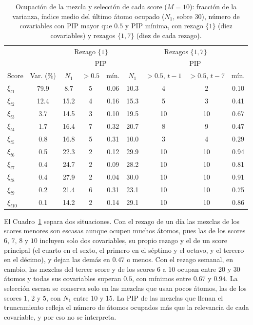 \begin{table}[H]
\centering\small
\setlength{\tabcolsep}{4pt}
\caption{Ocupación de la mezcla y selección de cada score ($M = 10$): fracción de la varianza, índice medio del último átomo ocupado ($N_1$, sobre 30), número de covariables con PIP mayor que $0.5$ y PIP mínima, con rezago $\{1\}$ (diez covariables) y rezagos $\{1,7\}$ (diez de cada rezago).}
\label{tab:aneC_pip}
\begin{tabular}{l c ccc cccc}
\hline
 & & \multicolumn{3}{c}{Rezago $\{1\}$} & \multicolumn{4}{c}{Rezagos $\{1,7\}$} \\
 & & & \multicolumn{2}{c}{PIP} & & \multicolumn{3}{c}{PIP} \\
Score & Var. (\%) & $N_1$ & $> 0.5$ & mín. & $N_1$ & $> 0.5$, $t-1$ & $> 0.5$, $t-7$ & mín. \\
\hline
$\xi_{t1}$  & 79.9 & 8.7  & 5 & 0.06 & 10.3 & 4  & 2  & 0.10 \\
$\xi_{t2}$  & 12.4 & 15.2 & 4 & 0.16 & 15.3 & 5  & 3  & 0.41 \\
$\xi_{t3}$  & 3.7  & 14.5 & 3 & 0.10 & 19.5 & 10 & 10 & 0.67 \\
$\xi_{t4}$  & 1.7  & 16.4 & 7 & 0.32 & 20.7 & 8  & 9  & 0.47 \\
$\xi_{t5}$  & 0.8  & 16.8 & 5 & 0.31 & 10.0 & 3  & 4  & 0.29 \\
$\xi_{t6}$  & 0.5  & 22.3 & 2 & 0.12 & 29.9 & 10 & 10 & 0.94 \\
$\xi_{t7}$  & 0.4  & 24.7 & 2 & 0.09 & 28.2 & 10 & 10 & 0.81 \\
$\xi_{t8}$  & 0.4  & 27.9 & 2 & 0.04 & 30.0 & 10 & 10 & 0.91 \\
$\xi_{t9}$  & 0.2  & 21.4 & 6 & 0.31 & 23.1 & 10 & 10 & 0.75 \\
$\xi_{t10}$ & 0.1  & 14.2 & 2 & 0.14 & 29.1 & 10 & 10 & 0.86 \\
\hline
\end{tabular}
\end{table}

El Cuadro~\ref{tab:aneC_pip} separa dos situaciones. Con el rezago de un día las mezclas de los scores menores son escasas aunque ocupen muchos átomos, pues las de los scores $6$, $7$, $8$ y $10$ incluyen solo dos covariables, su propio rezago y el de un score principal (el cuarto en el sexto, el primero en el séptimo y el octavo, y el tercero en el décimo), y dejan las demás en $0.47$ o menos. Con el rezago semanal, en cambio, las mezclas del tercer score y de los scores $6$ a $10$ ocupan entre 20 y 30 átomos y todas sus covariables superan $0.5$, con mínimos entre $0.67$ y $0.94$. La selección escasa se conserva solo en las mezclas que usan pocos átomos, las de los scores $1$, $2$ y $5$, con $N_1$ entre 10 y 15. La PIP de las mezclas que llenan el truncamiento refleja el número de átomos ocupados más que la relevancia de cada covariable, y por eso no se interpreta.
